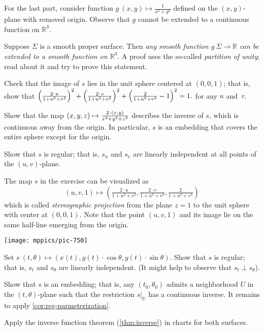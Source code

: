 \begin{multicols}{2}
For the last part, consider function $g\:(x,y)\mapsto\tfrac1{x^2+y^2}$ defined on the $(x,y)$-plane with removed origin.
Observe that $g$ cannot be extended to a continuous function on $\mathbb{R}^3$.

 Suppose $\Sigma$ is a smooth proper surface.
Then \textit{any smooth function $g\:\Sigma\to\mathbb{R}$ can be extended to a smooth function on $\mathbb{R}^3$}.
A proof uses the so-called \emph{partition of unity};
read about it and try to prove this statement.


Check that the image of $s$ lies in the unit sphere centered at $(0,0,1)$;
that is, show that 
$\left(\tfrac{2\cdot u}{1+u^2+v^2}\right)^2
\z+
\left(\tfrac{2\cdot v}{1+u^2+v^2}\right)^2
\z+
\left(\tfrac{2}{1+u^2+v^2}-1\right)^2=1.
$
for any $u$ and~$v$.

Show that the map 
$(x,y,z)\z\mapsto \tfrac{2\cdot(x,y)}{x^2+y^2+z^2}$
describes the inverse of $s$, which is continuous away from the origin.
In particular, $s$ is an embedding that covers the entire sphere except for the origin.

Show that $s$ is regular; that is, $s_u$ and $s_v$ are linearly independent at all points of the $(u,v)$-plane.

The map $s$ in the exercise can be visualized as
\[(u,v,1)\mapsto (\tfrac{2\cdot u}{1+u^2+v^2},\tfrac{2\cdot v}{1+u^2+v^2},\tfrac{2}{1+u^2+v^2})\]
which is called \emph{stereographic projection} from the plane $z=1$ to the unit sphere with center at $(0,0,1)$.
Note that the point $(u,v,1)$ and its image lie on the same half-line emerging from the origin. 

\begin{Figure}
\vskip-0mm
\centering
\texttt{[image: mppics/pic-750]}
\vskip0mm
\end{Figure}

Set
$s\:(t,\theta)\mapsto (x(t), y(t)\cdot\cos\theta,y(t)\cdot\sin\theta)$.
Show that $s$ is regular; that is, $s_t$ and $s_\theta$ are linearly independent.
(It might help to observe that $s_t\perp s_\theta$).

Show that $s$ is an embedding;
that is, any $(t_0,\theta_0)$ admits a neighborhood $U$ in the $(t,\theta)$-plane such that the restriction $s|_U$ has a continuous inverse.
It remains to apply \ref{cor:reg-parmeterization}.

 Apply the inverse function theorem (\ref{thm:inverse}) in charts for both surfaces. 


\end{multicols}
